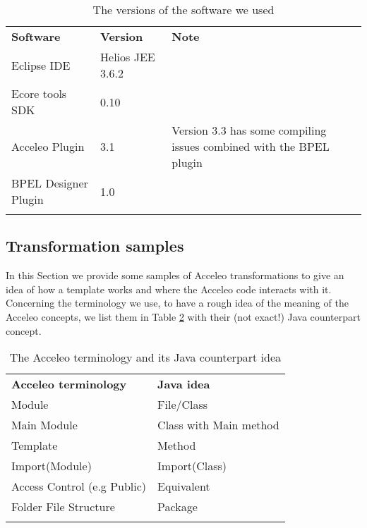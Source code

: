\begin{table}
\caption{The versions of the software we used}
\label{tab:softwareVersions}
\begin{center}
\begin{tabular}{l l p{7cm}}
						\toprule
						\addlinespace[0.2cm]
\textbf{Software} 	& \textbf{Version} 	& \textbf{Note} 	\\ 
						\cmidrule(l){1-3}
Eclipse IDE 			& Helios JEE 3.6.2				& 	\\[0,1cm]		
Ecore tools SDK			& 0.10						&  	\\[0,1cm]
Acceleo Plugin			& 3.1						& Version 3.3 has some compiling issues combined with the BPEL plugin    	\\[0,1cm]
BPEL Designer Plugin 		& 1.0						&  	\\[0,1cm]

						\addlinespace[0.2cm]
						\bottomrule
\end{tabular}
\end{center}
\end{table}

\subsection{Transformation samples}
\label{sec:codeSamples}
In this Section we provide some samples of Acceleo transformations to give an idea of how a template works and where the Acceleo code interacts with it. 
Concerning the terminology we use, to have a rough idea of the meaning of the Acceleo concepts, we list them in Table \ref{tab:terminology} with their (not exact!) Java counterpart concept.
\begin{table}[h!]
\caption{The Acceleo terminology and its Java counterpart idea}
\label{tab:terminology}
\begin{center}
\begin{tabular}{p{6cm} l} %
						\toprule
						\addlinespace[0.2cm]
\textbf{Acceleo terminology} 	& \textbf{Java idea} 	\\ 
						\cmidrule(l){1-2}
Module 				& File/Class				 	\\[0,1cm]		
Main Module			& Class with Main method		\\[0,1cm]
Template			& Method			  	\\[0,1cm]
Import(Module)			& Import(Class)			    	\\[0,1cm]
Access Control (e.g Public)	& Equivalent 					\\[0,1cm]
Folder File Structure		& Package				\\[0,1cm]

						\addlinespace[0.2cm]
						\bottomrule
\end{tabular}
\end{center}
\end{table}

